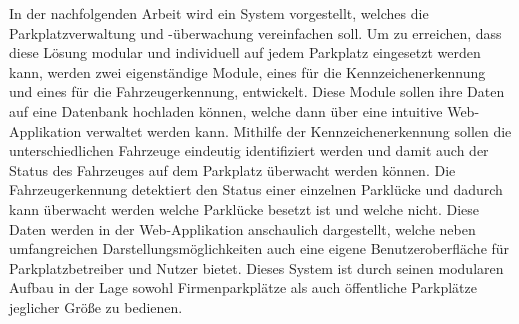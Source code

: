In der nachfolgenden Arbeit wird ein System vorgestellt, welches die Parkplatzverwaltung und -überwachung vereinfachen soll. 
Um zu erreichen, dass diese Lösung modular und individuell auf jedem Parkplatz eingesetzt werden kann, werden zwei eigenständige Module, 
eines für die Kennzeichenerkennung und eines für die Fahrzeugerkennung, entwickelt. Diese Module sollen ihre Daten auf eine Datenbank 
hochladen können, welche dann über eine intuitive Web-Applikation verwaltet werden kann. Mithilfe der Kennzeichenerkennung sollen die 
unterschiedlichen Fahrzeuge eindeutig identifiziert werden und damit auch der Status des Fahrzeuges auf dem Parkplatz überwacht werden können. 
Die Fahrzeugerkennung detektiert den Status einer einzelnen Parklücke und dadurch kann überwacht werden welche Parklücke besetzt ist und welche 
nicht. Diese Daten werden in der Web-Applikation anschaulich dargestellt, welche neben umfangreichen Darstellungsmöglichkeiten auch eine eigene 
Benutzeroberfläche für Parkplatzbetreiber und Nutzer bietet. Dieses System ist durch seinen modularen Aufbau in der Lage sowohl Firmenparkplätze 
als auch öffentliche Parkplätze jeglicher Größe zu bedienen.